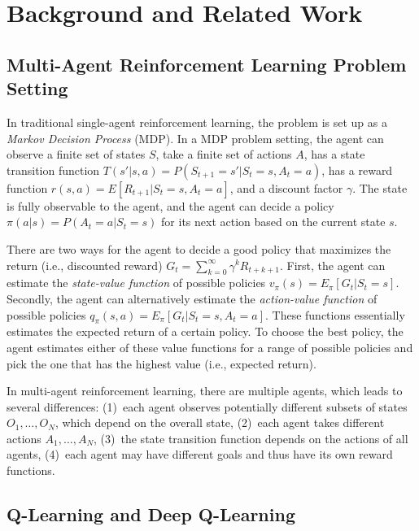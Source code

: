 
\section{Background and Related Work}
\label{sec:background}

\subsection{Multi-Agent Reinforcement Learning Problem Setting}
\label{sec:background:problem}

In traditional single-agent reinforcement learning, the problem is set up as a
\emph{Markov Decision Process} (MDP). In a MDP problem setting, the agent can observe
a finite set of states $S$, take a finite set of actions $A$, has a state
transition function $T(s'|s,a) = P(S_{t+1}=s'|S_t=s, A_t=a)$, has a reward
function $r(s,a) = E[R_{t+1}|S_t=s, A_t=a]$, and a discount factor $\gamma$.
The state is fully observable to the agent, and the agent can decide a policy
$\pi(a|s) = P(A_t=a | S_t=s)$ for its next action based on the current state
$s$.

There are two ways for the agent to decide a good policy that maximizes the
return (i.e., discounted reward) $G_t = \sum_{k=0}^\infty \gamma^k R_{t+k+1}$.
First, the agent can estimate the \emph{state-value function} of possible policies
$v_\pi(s) = E_\pi[G_t|S_t=s]$. Secondly, the agent can alternatively
estimate the \emph{action-value function} of possible policies
$q_\pi(s,a) = E_\pi[G_t|S_t=s, A_t=a]$. These functions essentially estimates
the expected return of a certain policy. To choose the best policy, the agent
estimates either of these value functions for a range of possible policies and
pick the one that has the highest value (i.e., expected return).

In multi-agent reinforcement learning, there are multiple agents, which leads
to several differences: (1)~each agent observes potentially different subsets
of states $O_1,\ldots,O_N$, which depend on the overall state, (2)~each agent
takes different actions $A_1,\ldots,A_N$, (3)~the state transition function
depends on the actions of all agents, (4)~each agent may have different goals
and thus have its own reward functions.


\subsection{Q-Learning and Deep Q-Learning}

